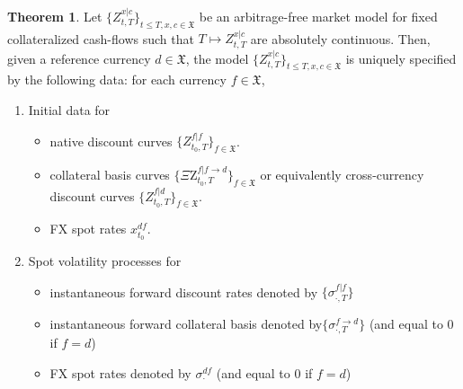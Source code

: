 \documentclass[11pt,english]{amsart}
\newcommand{\fr}{\mathfrak}
\newcommand{\QZ}{{\Xi\mathrm{Z}}}
\theoremstyle{definition}
\newtheorem{theo}{Theorem}
\begin{document}
\begin{theo}
Let $\{ Z^{x|c}_{t,T} \}_{t\le T, x,c\in\fr{X}}$ be an arbitrage-free market model for fixed collateralized cash-flows such that $T \mapsto Z^{x|c}_{t,T}$ are absolutely continuous. 
Then, given a reference currency $d \in \fr{X}$, the model $\{ Z^{x|c}_{t,T} \}_{t\le T, x,c\in\fr{X}}$ is uniquely specified by the following data:  for each currency $f \in \fr{X}$,
\begin{enumerate}
\item Initial data for
\begin{itemize}
\item native discount curves $\{ Z^{f|f}_{t_0,T} \}_{f\in\fr{X}}$.
\item collateral basis curves $\{ \QZ^{f|f\to d}_{t_0,T} \}_{f\in\fr{X}}$ or equivalently cross-currency discount curves $\{ Z^{f|d}_{t_0,T} \}_{f\in\fr{X}}$.
\item FX spot rates $x^{df}_{t_0}$. 
\end{itemize}
\item Spot volatility processes for 
\begin{itemize}
\item instantaneous forward discount rates denoted by $\{ \sigma^{f|f}_{\cdot,T} \}$ 
\item instantaneous forward collateral basis denoted by$\{ \sigma^{f\to d}_{\cdot,T} \}$ (and equal to 0 if $f=d$)
\item FX spot rates denoted by $\sigma^{df}_{\cdot}$ (and equal to 0 if $f=d$)
\end{itemize}
\end{enumerate}
\end{theo}
\end{document}
